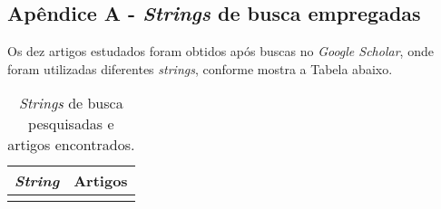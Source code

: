 \begin{center}
\chapter*{Apêndice A - \textit{Strings} de busca empregadas} \label{anex:anexo1}
\end{center}

Os dez artigos estudados foram obtidos após buscas no \textit{Google Scholar}, onde foram utilizadas diferentes \textit{strings}, conforme mostra a Tabela abaixo. 

\begin{center}
\begin{longtable}{ll}
\caption{\textit{Strings} de busca pesquisadas e artigos encontrados.}\\
\hline
\multicolumn{1}{c}{\textit{String}} & \multicolumn{1}{c}{Artigos} \\ \hline
\endfirsthead

\endhead

\endfoot

\endlastfoot


\end{longtable}
\end{center}
